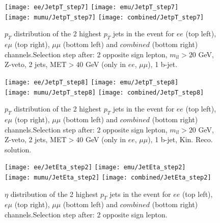 \clearpage
\newpage

\begin{figure}
  \texttt{[image: ee/JetpT\_step7]}
  \texttt{[image: emu/JetpT\_step7]}\\
  \texttt{[image: mumu/JetpT\_step7]}
  \texttt{[image: combined/JetpT\_step7]}
\caption{$p_T$ distribution of the 2 highest $p_T$ jets in the event for $ee$ (top left), $e\mu$ (top right), $\mu\mu$ (bottom left) and $combined$ (bottom right) channels.\newline Selection step after: 2 opposite sign lepton, $m_{ll}>20$ GeV, Z-veto, 2 jets, MET$>40$ GeV (only in $ee$, $\mu\mu$), 1 b-jet.}
\end{figure}

\clearpage
\newpage


\begin{figure}
  \texttt{[image: ee/JetpT\_step8]}
  \texttt{[image: emu/JetpT\_step8]}\\
  \texttt{[image: mumu/JetpT\_step8]}
  \texttt{[image: combined/JetpT\_step8]}
\caption{$p_T$ distribution of the 2 highest $p_T$ jets in the event for $ee$ (top left), $e\mu$ (top right), $\mu\mu$ (bottom left) and $combined$ (bottom right) channels.\newline Selection step after: 2 opposite sign lepton, $m_{ll}>20$ GeV, Z-veto, 2 jets, MET$>40$ GeV (only in $ee$, $\mu\mu$), 1 b-jet, Kin. Reco. solution.}
\end{figure}

\clearpage
\newpage





\begin{figure}
  \texttt{[image: ee/JetEta\_step2]}
  \texttt{[image: emu/JetEta\_step2]}\\
  \texttt{[image: mumu/JetEta\_step2]}
  \texttt{[image: combined/JetEta\_step2]}
\caption{$\eta$ distribution of the 2 highest $p_T$ jets in the event for $ee$ (top left), $e\mu$ (top right), $\mu\mu$ (bottom left) and $combined$ (bottom right) channels.\newline Selection step after: 2 opposite sign lepton.}
\end{figure}

